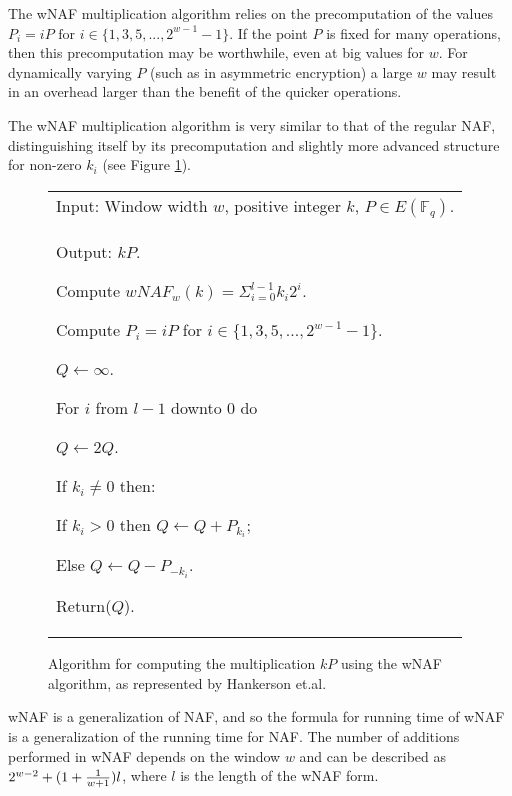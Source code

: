 The wNAF multiplication algorithm relies on the precomputation of the values \(P_i = iP \text{ for } i \in \{1,3,5,...,2^{w-1}-1\}\). If the
point \(P\) is fixed for many operations, then this precomputation may be worthwhile, even at big values for \(w\). For dynamically varying
\(P\) (such as in asymmetric encryption) a large \(w\) may result in an overhead larger than the benefit of the quicker operations.

The wNAF multiplication algorithm is very similar to that of the regular NAF, distinguishing itself by its precomputation and slightly more
advanced structure for non-zero \(k_i\) (see Figure \ref{fig:wnaf-algorithm}).

\begin{figure}[htb!]
	\begin{tabular}{|p{\textwidth}|}
		\hline
		Input: Window width \(w\), positive integer \(k\), \(P \in E(\mathbb{F}_q)\).\\
		Output: \(kP\).
		\begin{enumerate*}
			\item Compute \(wNAF_w(k) = \Sigma^{l-1}_{i=0} k_i 2^i\).
			\item Compute \(P_i = iP\) for \(i \in \{1,3,5,...,2^{w-1}-1\}\).
			\item \(Q \gets \infty\).
			\item For \(i\) from \(l - 1\) downto \(0\) do
			\begin{enumerate*}
				\item \(Q \gets 2Q\).
				\item If \(k_i \neq 0\) then:
				\begin{enumerate*}
					\item If \(k_i > 0\) then \(Q \gets Q + P_{k_i}\);
					\item Else \(Q \gets Q - P_{-k_i}\).
				\end{enumerate*}
			\end{enumerate*}
			\item Return(\(Q\)).
		\end{enumerate*} \\
		\hline
	\end{tabular}
	\caption{Algorithm for computing the multiplication \(kP\) using the wNAF algorithm, as represented by Hankerson et.al.\cite{hankerson2010}}
	\label{fig:wnaf-algorithm}
\end{figure}

wNAF is a generalization of NAF, and so the formula for running time of wNAF is a generalization of the running time for NAF. The number of
additions performed in wNAF depends on the window \(w\) and can be described as \(2^{w-2} + (1 + {1 \over {w + 1}}) l\), where \(l\) is the length
of the wNAF form.